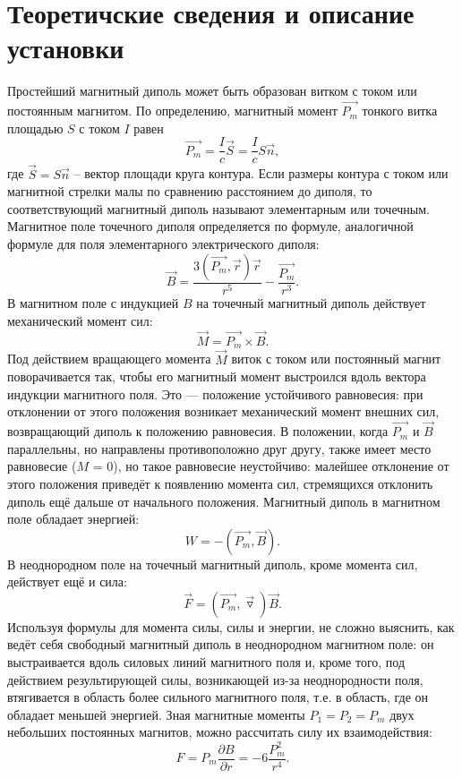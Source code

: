	\section*{Теоретичские сведения и описание установки}
	Простейший магнитный диполь может быть образован витком с током или постоянным магнитом. По определению, магнитный момент $\overrightarrow{P_m}$ тонкого витка площадью $S$ с током $I$ равен
$$
\overrightarrow{P_m}=\dfrac{I}{c}\vec{S}=\dfrac{I}{c}S\vec{n},
$$
где $\vec{S}=S\vec{n}$ -- вектор площади круга контура. Если размеры контура с током или магнитной стрелки малы по сравнению расстоянием до диполя, то соответствующий магнитный диполь называют элементарным или точечным.\\
Магнитное поле точечного диполя определяется по формуле, аналогичной формуле для поля
элементарного электрического диполя:
$$
\vec{B}=\dfrac{3(\overrightarrow{P_m},\vec{r})\vec{r}}{r^5} - \dfrac{\overrightarrow{P_m}}{r^3}.
$$ 
В магнитном поле с индукцией $B$
на точечный магнитный диполь 
действует механический
момент сил:
$$
\vec{M} = \overrightarrow{P_m}\times \vec{B}.
$$
Под действием вращающего момента $\vec{M}$ виток с током или постоянный магнит поворачивается
так, чтобы его магнитный момент выстроился вдоль вектора индукции магнитного поля. Это —
положение устойчивого равновесия: при отклонении от этого положения возникает механический
момент внешних сил, возвращающий диполь к положению равновесия. В положении, когда $\overrightarrow{P_m}$ и $\vec{B}$
параллельны, но направлены противоположно друг другу, также имеет место равновесие ($M$ = 0),
но такое равновесие неустойчиво: малейшее отклонение от этого положения приведёт к появлению
момента сил, стремящихся отклонить диполь ещё дальше от начального положения.\n\n
Магнитный диполь в магнитном поле обладает энергией:
$$
W = -(\overrightarrow{P_m},\vec{B}).
$$
В неоднородном поле на точечный магнитный диполь, кроме момента сил, действует ещё и сила:
$$
\vec{F}=(\overrightarrow{P_m},\vec{\triangledown})\vec{B}.
$$
Используя формулы для момента силы, силы и энергии, не сложно выяснить, как ведёт себя
свободный магнитный диполь в неоднородном магнитном поле: он выстраивается вдоль силовых
линий магнитного поля и, кроме того, под действием результирующей силы, возникающей из-за
неоднородности поля, втягивается в область более сильного магнитного поля, т.е. в область, где он
обладает меньшей энергией.\n\n
Зная магнитные моменты $P_1 = P_2 = P_m$ двух небольших постоянных магнитов, можно рассчитать силу
их взаимодействия:
$$
F = P_m \dfrac{\partial B}{\partial r}=-6\dfrac{P_m^2}{r^4}.
$$
